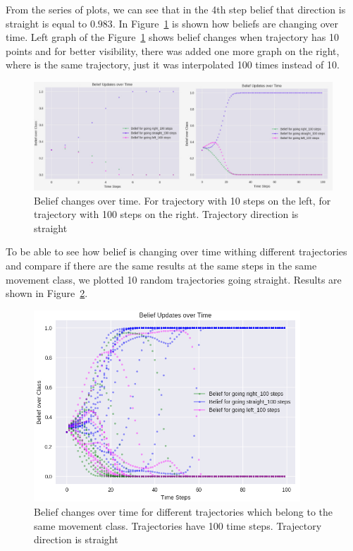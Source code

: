 From the series of plots, we can see that in the 4th step belief that direction is straight is equal to $0.983$. In Figure~\ref{fig:CompareStraight} is shown how beliefs are changing over time. Left graph of the Figure~\ref{fig:CompareStraight} shows belief changes when trajectory has 10 points and for better visibility, there was added one more graph on the right, where is the same trajectory, just it was interpolated 100 times instead of 10.

\begin{figure}[H]
	\centering  	
	\includegraphics[width=15cm]{img/10_100_compared_straight.jpg}
	\caption{Belief changes over time. For trajectory with 10 steps on the left, for trajectory with 100 steps on the right. Trajectory direction is straight}
	\label{fig:CompareStraight}    
\end{figure}

To be able to see how belief is changing over time withing different trajectories and compare if there are the same results at the same steps in the same movement class, we plotted 10 random trajectories going straight. Results are shown in Figure~\ref{fig:10Straight}.

\begin{figure}[H]
	\centering  	
	\includegraphics[width=10cm]{img/10_straights.jpg}
	\caption{Belief changes over time for different trajectories which belong to the same movement class. Trajectories have 100 time steps. Trajectory direction is straight}
	\label{fig:10Straight}    
\end{figure}

